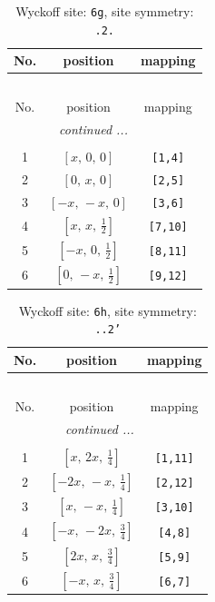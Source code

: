 \documentclass[fleqn,8pt]{jsarticle}
\begin{document}
\renewcommand{\arraystretch}{1.2}
\begin{longtable}{ccc}
\caption{Wyckoff site: {\tt 6g}, site symmetry: {\tt .2.}}
 \\
 \hline \hline
No. & position & mapping \\ \hline \endfirsthead

\multicolumn{2}{l}{\tablename\ \thetable{}} \\
 \hline \hline
No. & position & mapping \\ \hline \endhead

 \hline \hline
\multicolumn{2}{r}{\footnotesize\it continued ...} \\ \endfoot

 \hline \hline
\multicolumn{2}{r}{} \\ \endlastfoot

1 & $\left[ x,\, 0,\, 0 \right]$ & {\tt [1,4]} \\ \hline
2 & $\left[ 0,\, x,\, 0 \right]$ & {\tt [2,5]} \\ \hline
3 & $\left[ - x,\, - x,\, 0 \right]$ & {\tt [3,6]} \\ \hline
4 & $\left[ x,\, x,\, \frac{1}{2} \right]$ & {\tt [7,10]} \\ \hline
5 & $\left[ - x,\, 0,\, \frac{1}{2} \right]$ & {\tt [8,11]} \\ \hline
6 & $\left[ 0,\, - x,\, \frac{1}{2} \right]$ & {\tt [9,12]} \\
\end{longtable}
\renewcommand{\arraystretch}{1.2}
\begin{longtable}{ccc}
\caption{Wyckoff site: {\tt 6h}, site symmetry: {\tt ..2'}}
 \\
 \hline \hline
No. & position & mapping \\ \hline \endfirsthead

\multicolumn{2}{l}{\tablename\ \thetable{}} \\
 \hline \hline
No. & position & mapping \\ \hline \endhead

 \hline \hline
\multicolumn{2}{r}{\footnotesize\it continued ...} \\ \endfoot

 \hline \hline
\multicolumn{2}{r}{} \\ \endlastfoot

1 & $\left[ x,\, 2 x,\, \frac{1}{4} \right]$ & {\tt [1,11]} \\ \hline
2 & $\left[ - 2 x,\, - x,\, \frac{1}{4} \right]$ & {\tt [2,12]} \\ \hline
3 & $\left[ x,\, - x,\, \frac{1}{4} \right]$ & {\tt [3,10]} \\ \hline
4 & $\left[ - x,\, - 2 x,\, \frac{3}{4} \right]$ & {\tt [4,8]} \\ \hline
5 & $\left[ 2 x,\, x,\, \frac{3}{4} \right]$ & {\tt [5,9]} \\ \hline
6 & $\left[ - x,\, x,\, \frac{3}{4} \right]$ & {\tt [6,7]} \\
\end{longtable}
\end{document}
